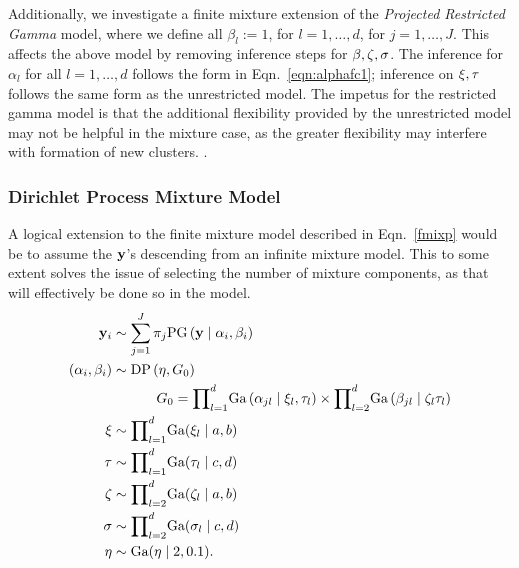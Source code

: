 Additionally, we investigate a finite mixture extension of the \emph{Projected Restricted Gamma} model,
  where we define all $\beta_l := 1$, for $l = 1,\ldots,d$, for $j = 1,\ldots,J$.  This affects the above
  model by removing inference steps for ${\bf \beta},{\bf \zeta},{\bf \sigma}$.  The inference for
  $\alpha_l$ for all $l = 1,\ldots,d$ follows the form in Eqn.~\ref{eqn:alphafc1}; inference on
  ${\bf \xi,\tau}$ follows the same form as the unrestricted model.  The impetus for the restricted
  gamma model is that the additional flexibility provided by the unrestricted model may not be helpful
  in the mixture case, as the greater flexibility may interfere with formation of new clusters.
  .

\subsubsection{Dirichlet Process Mixture Model}
A logical extension to the finite mixture model described in Eqn.~\ref{fmixp} would be to assume the
  ${\bf y}$'s descending from an infinite mixture model.  This to some extent solves the issue of
  selecting the number of mixture components, as that will effectively be done so in the model.
  \begin{equation}
    \label{eqn:infmixp}
    \begin{aligned}
      {\bf y}_i &\sim \sum_{j = 1}^J\pi_j\text{PG}\left({\bf y}\mid {\bf \alpha}_i, {\bf \beta}_i\right)\\
      (\alpha_i,\beta_i) &\sim \text{DP}\left(\eta, G_0\right)\\
      &~\hspace{1cm}G_0 = {\small\prod}_{l = 1}^d\text{Ga}\left(\alpha_{jl}\mid\xi_{l},\tau_{l}\right)
                    \times{\small\prod}_{l=2}^d\text{Ga}\left(\beta_{jl}\mid\zeta_{l}\tau_{l}\right)\\
      {\bf \xi} &\sim {\small \prod}_{l = 1}^d \text{Ga}(\xi_l\mid a,b)\\
      {\bf \tau} &\sim {\small \prod}_{l = 1}^d \text{Ga}(\tau_l\mid c,d)\\
      {\bf \zeta} &\sim {\small\prod}_{l = 2}^d\text{Ga}(\zeta_l \mid a,b)\\
      {\bf \sigma} &\sim {\small\prod}_{l = 2}^d\text{Ga}(\sigma_l\mid c,d)\\
      {\bf \eta} &\sim \text{Ga}(\eta \mid 2, 0.1).
    \end{aligned}
  \end{equation}
